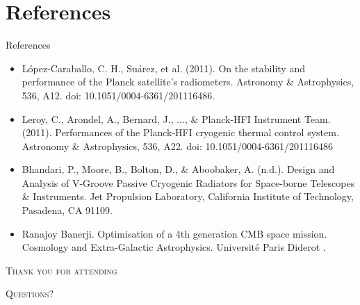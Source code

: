 \section{References}
\begin{frame}{References}
\begin{itemize}
\small
    \item López-Caraballo, C. H., Suárez, et al. (2011). On the stability and performance of the Planck satellite’s radiometers. Astronomy \& Astrophysics, 536, A12. doi: 10.1051/0004-6361/201116486.
    \item Leroy, C., Arondel, A., Bernard, J., ..., \& Planck-HFI Instrument Team. (2011). Performances of the Planck-HFI cryogenic thermal control system. Astronomy \& Astrophysics, 536, A22. doi: 10.1051/0004-6361/201116486
    \item Bhandari, P., Moore, B., Bolton, D., \& Aboobaker, A. (n.d.). Design and Analysis of V-Groove Passive Cryogenic Radiators for Space-borne Telescopes \& Instruments. Jet Propulsion Laboratory, California Institute of Technology, Pasadena, CA 91109.
    \item Ranajoy Banerji. Optimisation of a 4th generation CMB space mission. Cosmology and Extra-Galactic Astrophysics. Université Paris Diderot .
\end{itemize}
\end{frame}

 

\begin{frame}[standout]
    \Huge\textsc{Thank you for attending}
    
    \vfill
    
    \LARGE\textsc{Questions?}
\end{frame}






